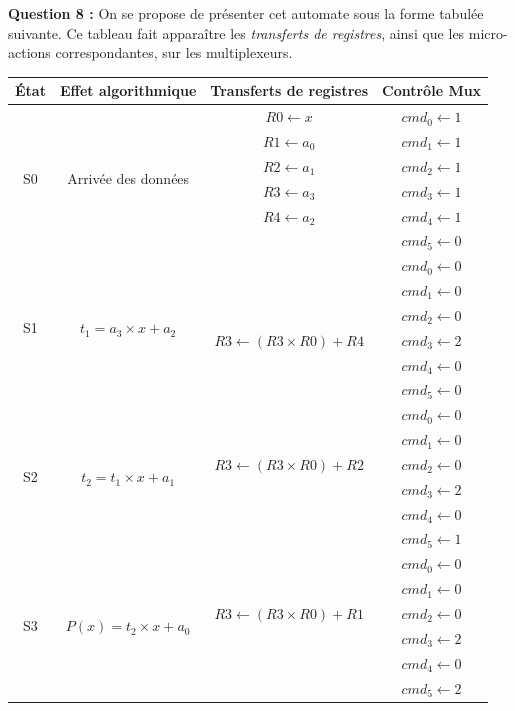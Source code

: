 \documentclass[a4paper,11pt]{article}
\newif\ifsolutions
\begin{document}
\ifsolutions
\begin{solbox}
\textbf{Question 8 :} On se propose de présenter cet automate sous la forme tabulée suivante. Ce tableau fait apparaître les \textit{transferts de registres}, ainsi que les micro-actions correspondantes, sur les multiplexeurs.

\vspace{0.5em}
\centering
\renewcommand{\arraystretch}{1.2}
\begin{tabular}{|c|c|c|c|}
\toprule
\textbf{État} & \textbf{Effet algorithmique} & \textbf{Transferts de registres} & \textbf{Contrôle Mux} \\
\midrule
\multirow{6}{*}{S0} & \multirow{6}{*}{Arrivée des données} & $R0 \leftarrow x$ & $cmd_0 \leftarrow 1$ \\
 & & $R1 \leftarrow a_0$ & $cmd_1 \leftarrow 1$ \\
 & & $R2 \leftarrow a_1$ & $cmd_2 \leftarrow 1$ \\
 & & $R3 \leftarrow a_3$ & $cmd_3 \leftarrow 1$ \\
 & & $R4 \leftarrow a_2$ & $cmd_4 \leftarrow 1$ \\
 & & & $cmd_5 \leftarrow 0$ \\
\midrule
\multirow{6}{*}{S1} & \multirow{6}{*}{$t_1=a_3 \times x+a_2$} & & $cmd_0 \leftarrow 0$ \\
 & & & $cmd_1 \leftarrow 0$ \\
 & & & $cmd_2 \leftarrow 0$ \\
 & & $R3 \leftarrow (R3 \times R0)+R4$ & $cmd_3 \leftarrow 2$ \\
 & & & $cmd_4 \leftarrow 0$ \\
 & & & $cmd_5 \leftarrow 0$ \\
\midrule
\multirow{6}{*}{S2} & \multirow{6}{*}{$t_2=t_1 \times x+a_1$} & & $cmd_0 \leftarrow 0$ \\
 & & & $cmd_1 \leftarrow 0$ \\
 & & $R3 \leftarrow (R3 \times R0)+R2$ & $cmd_2 \leftarrow 0$ \\
 & & & $cmd_3 \leftarrow 2$ \\
 & & & $cmd_4 \leftarrow 0$ \\
 & & & $cmd_5 \leftarrow 1$ \\
\midrule
\multirow{6}{*}{S3} & \multirow{6}{*}{$P(x)=t_2 \times x+a_0$} & & $cmd_0 \leftarrow 0$ \\
 & & & $cmd_1 \leftarrow 0$ \\
 & & $R3 \leftarrow (R3 \times R0)+R1$ & $cmd_2 \leftarrow 0$ \\
 & & & $cmd_3 \leftarrow 2$ \\
 & & & $cmd_4 \leftarrow 0$ \\
 & & & $cmd_5 \leftarrow 2$ \\
\bottomrule
\end{tabular}


\end{solbox}
\end{document}
